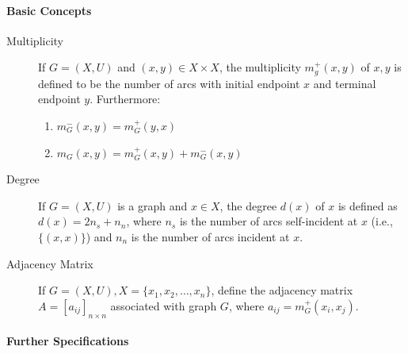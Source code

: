 \documentclass[12pt]{article}
\begin{document}
\paragraph{Basic Concepts \cite{berge1973}}
\begin{description}
	\item[Multiplicity] If $G=(X, U)$ and $(x, y) \in X\times X$, the multiplicity $m_g^+(x, y)$ of $x, y$ is defined to be the number of arcs with initial endpoint $x$ and terminal endpoint $y$. Furthermore:
	\begin{enumerate}
		\item $m_G^-(x, y) = m_G^+(y, x)$
		\item $m_G(x, y) = m_G^+(x, y) + m_G^-(x, y)$
	\end{enumerate}

	\item[Degree] If $G=(X, U)$ is a graph and $x\in X$, the degree $d(x)$ of $x$ is defined \cite{may1972} as
	$d(x) = 2n_s  + n_n$, where $n_s$ is the number of arcs self-incident at $x$ (i.e., $\{(x, x)\}$) and $n_n$ is the number of arcs incident at $x$.

	\item[Adjacency Matrix] If $G=(X, U), X=\{x_1, x_2, \dots, x_n \}$, define the adjacency matrix $A=[a_{ij}]_{n\times n}$ associated with graph $G$, where $a_{ij} = m_G^+(x_i, x_j)$.
\end{description}

\paragraph{Further Specifications}
\end{document}
